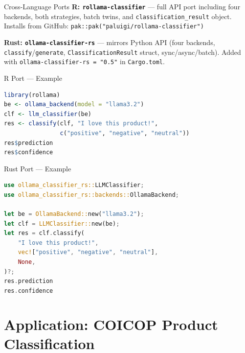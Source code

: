 \documentclass[aspectratio=169,11pt]{beamer}
\begin{document}
\begin{frame}{Cross-Language Ports}
  \textbf{R: \texttt{rollama-classifier}} — full API port including four
  backends, both strategies, batch twins, and \texttt{classification\_result}
  object. Installs from GitHub:
  \texttt{pak::pak("paluigi/rollama-classifier")}

  \vspace{0.6em}
  \textbf{Rust: \texttt{ollama-classifier-rs}} — mirrors Python API (four
  backends, \texttt{classify}/\texttt{generate}, \texttt{ClassificationResult}
  struct, sync/async/batch). Added with
  \texttt{ollama-classifier-rs = "0.5"} in \texttt{Cargo.toml}.
\end{frame}

\begin{frame}[fragile]{R Port — Example}
\begin{lstlisting}[language=R]
library(rollama)
be <- ollama_backend(model = "llama3.2")
clf <- llm_classifier(be)
res <- classify(clf, "I love this product!",
                c("positive", "negative", "neutral"))
res$prediction
res$confidence
\end{lstlisting}
\end{frame}

\begin{frame}[fragile]{Rust Port — Example}
\begin{lstlisting}[language=Rust]
use ollama_classifier_rs::LLMClassifier;
use ollama_classifier_rs::backends::OllamaBackend;

let be = OllamaBackend::new("llama3.2");
let clf = LLMClassifier::new(be);
let res = clf.classify(
    "I love this product!",
    vec!["positive", "negative", "neutral"],
    None,
)?;
res.prediction
res.confidence
\end{lstlisting}
\end{frame}

\section{Application: COICOP Product Classification}
\end{document}
